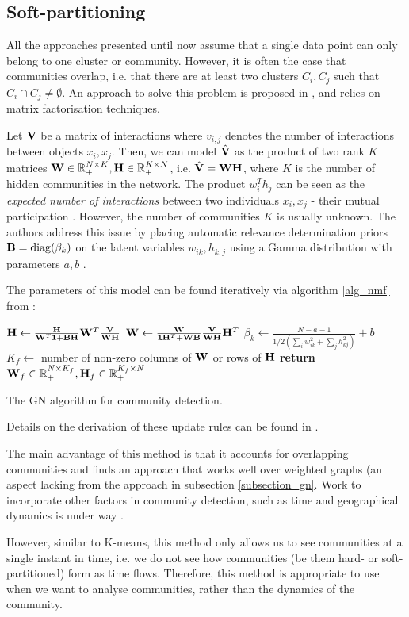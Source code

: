 \documentclass[../main.tex]{subfiles} \label{chapter_soa}
\begin{document}
\subsection{Soft-partitioning} \label{subsection_softpart}
All the approaches presented until now assume that a single data point can only belong to one cluster or community. However, it is often the case that communities overlap, i.e. that there are at least two clusters $C_i, C_j$ such that $C_i \cap C_j \neq \emptyset$. An approach to solve this problem is proposed in \cite{Psorakis2010}, and relies on matrix factorisation techniques.
\par Let $\mathbf{V}$ be a matrix of interactions where $v_{i,j}$ denotes the number of interactions between objects $x_i, x_j$. Then, we can model $\hat{\mathbf{V}}$ as the product of two rank $K$ matrices $\mathbf{W} \in \mathbb{R}_+^{N \times K}, \mathbf{H}\in \mathbb{R}_+^{K \times N}$, i.e. $\hat{\mathbf{V}} = \mathbf{WH}$, where $K$ is the number of hidden communities in the network. The product $w_i^Th_j$ can be seen as the \emph{expected number of interactions} between two individuals $x_i, x_j$ - their mutual participation \cite{Psorakis2010}. However, the number of communities $K$ is usually unknown. The authors address this issue by placing automatic relevance determination priors $\mathbf{B} = \text{diag}(\beta_k)$ on the latent variables $w_{ik}, h_{k, j}$ using a Gamma distribution with parameters $a, b$ \cite{Psorakis2010a}.
\par The parameters of this model can be found iteratively via algorithm \ref{alg_nmf} from \cite{Psorakis2010a}:
\begin{algorithm}
\begin{algorithmic}[1]
\Repeat
    \State $\mathbf{H} \gets \frac{\mathbf{H}}{\mathbf{W}^T\mathbf{1}+\mathbf{BH}}\mathbf{W}^T\mathbf{\frac{\mathbf{V}}{\mathbf{WH}}}$
    \State $\mathbf{W} \gets \frac{\mathbf{W}}{\mathbf{1}\mathbf{H}^T+\mathbf{WB}}\mathbf{\frac{\mathbf{V}}{\mathbf{WH}}}\mathbf{H}^T$
    \State $\beta_k \gets \frac{N-a-1}{1/2(\sum_i{w_{ik}^2} + \sum_j{h_{kj}^2})} + b$
$K_f \gets $ number of non-zero columns of $\mathbf{W}$ or rows of $\mathbf{H}$
\State \textbf{return} $\mathbf{W}_f \in \mathbb{R}_+^{N\times K_f}, \mathbf{H}_f\in\mathbb{R}_+^{K_f\times N}$
\EndFunction
\caption{The GN algorithm for community detection.}\label{alg_nmf}
\end{algorithmic}
\end{algorithm}
\par Details on the derivation of these update rules can be found in \cite{Psorakis2010,Psorakis2010a}. 
\par The main advantage of this method is that it accounts for overlapping communities and finds an approach that works well over weighted graphs (an aspect lacking from the approach in subsection \ref{subsection_gn}. Work to incorporate other factors in community detection, such as time and geographical dynamics is under way \cite{Psorakis2010}.
\par However, similar to K-means, this method only allows us to see communities at a single instant in time, i.e. we do not see how communities (be them hard- or soft-partitioned) form as time flows. Therefore, this method is appropriate to use when we want to analyse communities, rather than the dynamics of the community.
\end{document}

